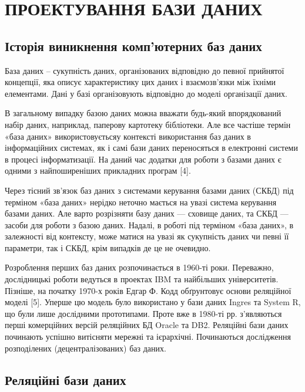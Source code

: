 \section{ПРОЕКТУВАННЯ БАЗИ ДАНИХ}

\subsection{Історія виникнення комп’ютерних баз даних}

База даних – сукупність даних, організованих відповідно до певної прийнятої концепції, яка описує характеристику цих даних і взаємозв'язки між їхніми елементами. Дані у базі організовують відповідно до моделі організації даних. 

В загальному випадку базою даних можна вважати будь-який впорядкований набір даних, наприклад, паперову картотеку бібліотеки. Але все частіше термін «база даних» використовуєтьсяу контексті використання баз даних в інформаційних системах, як і самі бази даних переносяться в електронні системи в процесі інформатизації. На даний час додатки для роботи з базами даних є одними з найпоширеніших прикладних програм [4].

Через тісний зв'язок баз даних з системами керування базами даних (СКБД) під терміном «база даних» нерідко неточно мається на увазі система керування базами даних. Але варто розрізняти базу даних — сховище даних, та СКБД — засоби для роботи з базою даних. Надалі, в роботі під терміном «база даних», в залежності від контексту, може матися на увазі як сукупність даних чи певні її параметри, так і СКБД, крім випадків де це не очевидно.

Розроблення перших баз даних розпочинається в 1960-ті роки. Переважно, дослідницькі роботи ведуться в проектах IBM та найбільших університетів. Пізніше, на початку 1970-х років Едгар Ф. Кодд обґрунтовує основи реляційної моделі [5]. Уперше цю модель було використано у бази даних Ingres та System R, що були лише дослідними прототипами. Проте вже в 1980-ті рр. з’являються перші комерційних версій реляційних БД Oracle та DB2. Реляційні бази даних починають успішно витісняти мережні та ієрархічні. Починаються дослідження розподілених (децентралізованих) баз даних.

\subsection{Реляційні бази даних}

